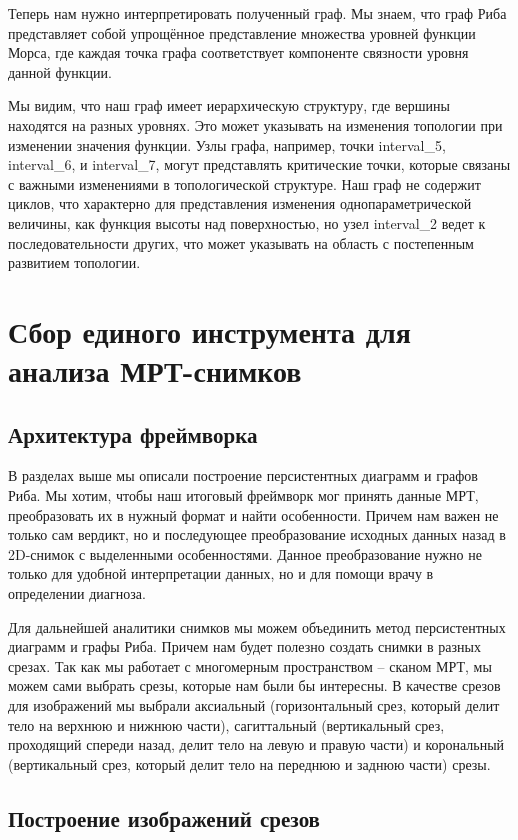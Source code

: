 \documentclass[a4paper,12pt]{extarticle}
\begin{document}
Теперь нам нужно интерпретировать полученный граф. Мы знаем, что граф Риба представляет собой упрощённое представление множества уровней функции Морса, где каждая точка графа соответствует компоненте связности уровня данной функции.

Мы видим, что наш граф имеет иерархическую структуру, где вершины находятся на разных уровнях. Это может указывать на изменения топологии при изменении значения функции. Узлы графа, например, точки interval\_5, interval\_6, и interval\_7, могут представлять критические точки, которые связаны с важными изменениями в топологической структуре. Наш граф не содержит циклов, что характерно для представления изменения однопараметрической величины, как функция высоты над поверхностью, но узел interval\_2 ведет к последовательности других, что может указывать на область с постепенным развитием топологии.

\section{Сбор единого инструмента для анализа МРТ-снимков}

\subsection{Архитектура фреймворка}

В разделах выше мы описали построение персистентных диаграмм и графов Риба. Мы хотим, чтобы наш итоговый фреймворк мог принять данные МРТ, преобразовать их в нужный формат и найти особенности. Причем нам важен не только сам вердикт, но и последующее преобразование исходных данных назад в 2D-снимок с выделенными особенностями. Данное преобразование нужно не только для удобной интерпретации данных, но и для помощи врачу в определении диагноза.

Для дальнейшей аналитики снимков мы можем объединить метод персистентных диаграмм и графы Риба. Причем нам будет полезно создать снимки в разных срезах. Так как мы работает с многомерным пространством – сканом МРТ, мы можем сами выбрать срезы, которые нам были бы интересны. В качестве срезов для изображений мы выбрали аксиальный (горизонтальный срез, который делит тело на верхнюю и нижнюю части), сагиттальный (вертикальный срез, проходящий спереди назад, делит тело на левую и правую части) и корональный (вертикальный срез, который делит тело на переднюю и заднюю части) срезы. 

\subsection{Построение изображений срезов}
\end{document}
